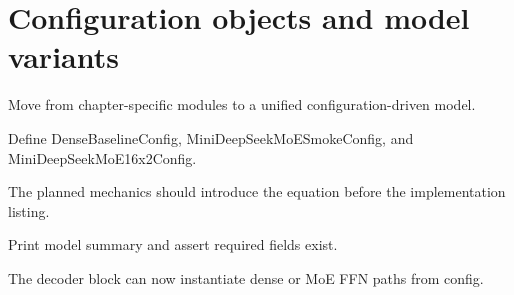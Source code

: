 \section{Configuration objects and model variants}
\label{sec:ch10-configuration-objects-and-model-variants}

Move from chapter-specific modules to a unified configuration-driven model.



Define DenseBaselineConfig, MiniDeepSeekMoESmokeConfig, and MiniDeepSeekMoE16x2Config.



The planned mechanics should introduce the equation before the implementation listing.





\begin{checkpointbox}
Print model summary and assert required fields exist.
\end{checkpointbox}

The decoder block can now instantiate dense or MoE FFN paths from config.
